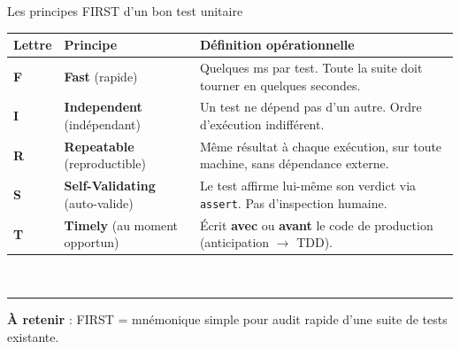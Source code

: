 \documentclass[aspectratio=169,11pt]{beamer}
\newcommand{\takeaway}[1]{%
\vfill\begin{beamercolorbox}[wd=\linewidth,sep=0.4em]{}
\color{accent2}\rule[0.6ex]{1.2em}{1.2pt}\hspace{0.4em}%
\textbf{\color{accent2}\small À retenir} \textcolor{textsoft}{:} %
{\small\color{textmain}#1}
\end{beamercolorbox}}
\begin{document}
\begin{frame}[t,shrink=10]{Les principes FIRST d'un bon test unitaire}
\vspace{0.2cm}
\centering
{}
\vspace{0.5cm}
\footnotesize
\begin{tabular}{@{}p{1.4cm} p{2.6cm} p{8.4cm}@{}}
\toprule
\textbf{\color{accent}Lettre} & \textbf{\color{accent}Principe} & \textbf{\color{accent}Définition opérationnelle} \\
\midrule
\textbf{F} & \textbf{Fast} (rapide)
& Quelques ms par test. Toute la suite doit tourner en quelques secondes.\\
\textbf{I} & \textbf{Independent} (indépendant)
& Un test ne dépend pas d'un autre. Ordre d'exécution indifférent.\\
\textbf{R} & \textbf{Repeatable} (reproductible)
& Même résultat à chaque exécution, sur toute machine, sans dépendance externe.\\
\textbf{S} & \textbf{Self-Validating} (auto-valide)
& Le test affirme lui-même son verdict via \texttt{assert}. Pas d'inspection humaine.\\
\textbf{T} & \textbf{Timely} (au moment opportun)
& Écrit \textbf{avec} ou \textbf{avant} le code de production (anticipation $\to$ TDD).\\
\bottomrule
\end{tabular}
\vspace{0.2cm}
\\
\takeaway{FIRST = mnémonique simple pour audit rapide d'une suite de tests existante.}
\end{frame}
\end{document}
